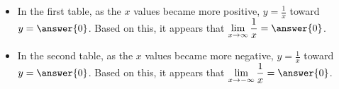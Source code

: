 \documentclass{ximera}
\begin{document}
\begin{problem}
\begin{itemize}
  
\item In the first table, as the $x$ values became more positive, $y = \frac{1}{x}$  toward $y = \answer{0}$.  Based on this, it appears that $\displaystyle\lim_{x \to \infty} \frac{1}{x} = \answer{0}$.

\item In the second table, as the $x$ values became more negative, $y = \frac{1}{x}$  toward $y = \answer{0}$.  Based on this, it appears that $\displaystyle\lim_{x \to -\infty} \frac{1}{x} = \answer{0}$.

\end{itemize}

\end{problem}
\end{document}
